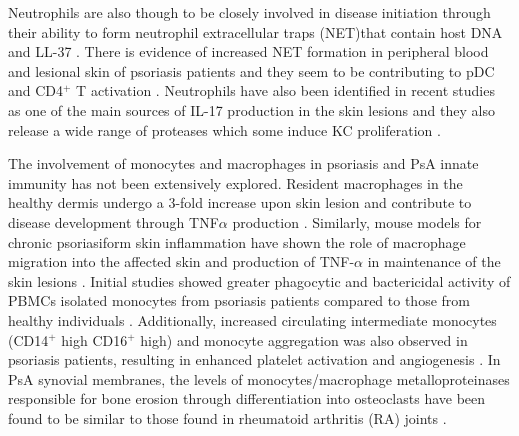 Neutrophils are also though to be closely involved in disease initiation through their ability to form neutrophil extracellular traps (NET)that contain host DNA and LL-37 \parencite{Hu2016}. There is evidence of increased NET formation in peripheral blood and lesional skin of psoriasis patients and they seem to be contributing to pDC and CD4$^+$ T activation \parencite{Hu2016}. Neutrophils have also been identified in recent studies as one of the main sources of IL-17 production in the skin lesions \parencite{Lin2011} and they also release a wide range of proteases which some induce KC proliferation \parencite{Mahil2006}.


%
%


The involvement of monocytes and macrophages in psoriasis and PsA innate immunity has not been extensively explored. Resident macrophages in the healthy dermis undergo a 3-fold increase upon skin lesion and contribute to disease development through TNF$\alpha$ production \parencite{Perera2012, Mahil2016}. Similarly, mouse models for chronic psoriasiform skin inflammation have shown the role of macrophage migration into the affected skin and production of TNF-$\alpha$ in maintenance of the skin lesions \parencite{Stratis2006, Wang2006}. Initial studies showed greater phagocytic and bactericidal activity of PBMCs isolated monocytes from psoriasis patients compared to those from healthy individuals \parencite{Bar-Eli1979}. Additionally, increased circulating intermediate monocytes (CD14$^+$ high CD16$^+$ high) and monocyte aggregation was also observed in psoriasis patients, resulting in enhanced platelet activation and angiogenesis \parencite {Golden2015}. In PsA synovial membranes, the levels of monocytes/macrophage metalloproteinases responsible for bone erosion through differentiation into osteoclasts  have been found to be similar to those found in rheumatoid arthritis (RA) joints \parencite{Hitchon2002}. 

